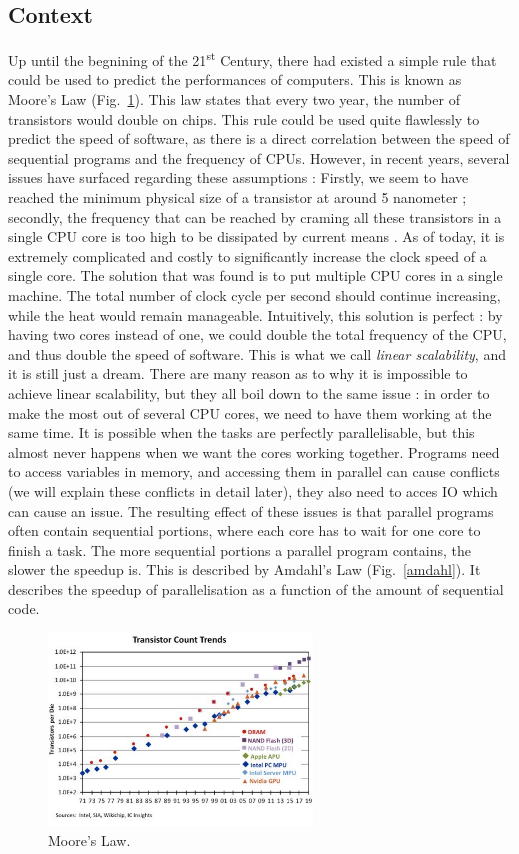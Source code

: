 \documentclass[conference]{IEEEtran}
\begin{document}
\subsection{Context}
Up until the begnining of the 21\textsuperscript{st} Century, there had existed a simple rule that could be used to predict the performances of computers. This is known as Moore's Law (Fig.~\ref{moore}). This law states that every two year, the number of transistors would double on chips. This rule could be used quite flawlessly to predict the speed of software, as there is a direct correlation between the speed of sequential programs and the frequency of CPUs. However, in recent years, several issues have surfaced regarding these assumptions : Firstly, we seem to have reached the minimum physical size of a transistor at around 5 nanometer ; secondly, the frequency that can be reached by craming all these transistors in a single CPU core is too high to be dissipated by current means \cite{moore}. As of today, it is extremely complicated and costly to significantly increase the clock speed of a single core. The solution that was found is to put multiple CPU cores in a single machine. The total number of clock cycle per second should continue increasing, while the heat would remain manageable. Intuitively, this solution is perfect : by having two cores instead of one, we could double the total frequency of the CPU, and thus double the speed of software. This is what we call \textit{linear scalability}, and it is still just a dream. There are many reason as to why it is impossible to achieve linear scalability, but they all boil down to the same issue : in order to make the most out of several CPU cores, we need to have them working at the same time. It is possible when the tasks are perfectly parallelisable, but this almost never happens when we want the cores working together. Programs need to access variables in memory, and accessing them in parallel can cause conflicts (we will explain these conflicts in detail later), they also need to acces IO which can cause an issue. The resulting effect of these issues is that parallel programs often contain sequential portions, where each core has to wait for one core to finish a task. The more sequential portions a parallel program contains, the slower the speedup is. This is described by Amdahl's Law \cite{amdahl} (Fig.~\ref{amdahl}). It describes the speedup of parallelisation as a function of the amount of sequential code.

\begin{figure}[!ht]
\centerline{\includegraphics[width=70mm]{moore.jpg}}
\caption{Moore's Law.}\label{moore}
\end{figure}
\end{document}
